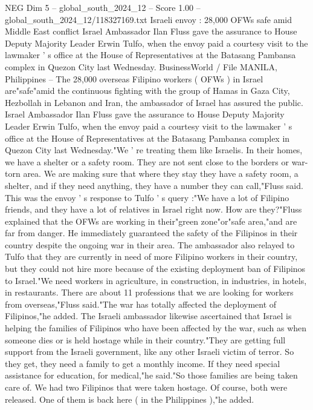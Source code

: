 \begin{textsample}{NEG Dim 5 – global\_south\_2024\_12 – Score 1.00 – global\_south\_2024\_12/118327169.txt}  \label{ex:f5_neg_406}
Israeli envoy : 28,000 OFWs safe amid Middle East conflict Israel Ambassador Ilan Fluss gave the assurance to House Deputy Majority Leader Erwin Tulfo, when the envoy paid a courtesy visit to the lawmaker ' s office at the House of Representatives at the Batasang Pambansa complex in Quezon City last Wednesday.
BusinessWorld / File MANILA, Philippines -- The 28,000 overseas Filipino workers ( OFWs ) in Israel are"safe"amid the continuous fighting with the group of Hamas in Gaza City, Hezbollah in Lebanon and Iran, the ambassador of Israel has assured the public.
Israel Ambassador Ilan Fluss gave the assurance to House Deputy Majority Leader Erwin Tulfo, when the envoy paid a courtesy visit to the lawmaker ' s office at the House of Representatives at the Batasang Pambansa complex in Quezon City last Wednesday."We ' re treating them like Israelis.
In their homes, we have a shelter or a safety room.
They are not sent close to the borders or war-torn area.
We are making sure that where they stay they have a safety room, a shelter, and if they need anything, they have a number they can call,"Fluss said.
This was the envoy ' s response to Tulfo ' s query :"We have a lot of Filipino friends, and they have a lot of relatives in Israel right now.
How are they?"Fluss explained that the OFWs are working in their"green zone"or"safe area,"and are far from danger.
He immediately guaranteed the safety of the Filipinos in their country despite the ongoing war in their area.
The ambassador also relayed to Tulfo that they are currently in need of more Filipino workers in their country, but they could not hire more because of the existing deployment ban of Filipinos to Israel."We need workers in agriculture, in construction, in industries, in hotels, in restaurants.
There are about 11 professions that we are looking for workers from overseas,"Fluss said."The war has totally affected the deployment of Filipinos,"he added.
The Israeli ambassador likewise ascertained that Israel is helping the families of Filipinos who have been affected by the war, such as when someone dies or is held hostage while in their country."They are getting full support from the Israeli government, like any other Israeli victim of terror.
So they get, they need a family to get a monthly income.
If they need special assistance for education, for medical,"he said."So those families are being taken care of.
We had two Filipinos that were taken hostage.
Of course, both were released.
One of them is back here ( in the Philippines ),"he added.

\end{textsample}
